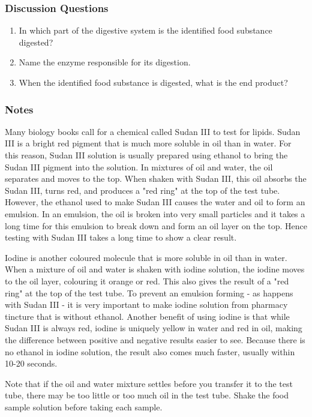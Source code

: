 \subsubsection*{Discussion Questions}
\begin{enumerate}
\item{In which part of the digestive system is the identified food substance digested?}
\item{Name the enzyme responsible for its digestion.}
\item{When the identified food substance is digested, what is the end product?}
\end{enumerate}

\subsubsection*{Notes}
Many biology books call for a chemical called Sudan III to test for lipids. Sudan III is a bright red pigment that is much more soluble in oil than in water. For this reason, Sudan III solution is usually prepared using ethanol to bring the Sudan III pigment into the solution. In mixtures of oil and water, the oil separates and moves to the top. When shaken with Sudan III, this oil absorbs the Sudan III, turns red, and produces a "red ring" at the top of the test tube. However, the ethanol used to make Sudan III causes the water and oil to form an emulsion. In an emulsion, the oil is broken into very small particles and it takes a long time for this emulsion to break down and form an oil layer on the top. Hence testing with Sudan III takes a long time to show a clear result.

Iodine is another coloured molecule that is more soluble in oil than in water. When a mixture of oil and water is shaken with iodine solution, the iodine moves to the oil layer, colouring it orange or red. This also gives the result of a "red ring" at the top of the test tube. To prevent an emulsion forming - as happens with Sudan III - it is very important to make iodine solution from pharmacy tincture that is without ethanol. Another benefit of using iodine is that while Sudan III is always red, iodine is uniquely yellow in water and red in oil, making the difference between positive and negative results easier to see. Because there is no ethanol in iodine solution, the result also comes much faster, usually within 10-20 seconds.

Note that if the oil and water mixture settles before you transfer it to the test tube, there may be too little or too much oil in the test tube. Shake the food sample solution before taking each sample.


